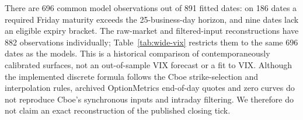There are 696 common model observations out of 891 fitted dates: on 186
dates a required Friday maturity exceeds the 25-business-day horizon, and
nine dates lack an eligible expiry bracket. The raw-market and filtered-input
reconstructions have 882 observations individually; Table~\ref{tab:wide-vix}
restricts them to the same 696 dates as the models. This is a historical
comparison of contemporaneously calibrated surfaces, not an out-of-sample
VIX forecast or a fit to VIX. Although the implemented discrete formula
follows the Cboe strike-selection and interpolation rules, archived
OptionMetrics end-of-day quotes and zero curves do not reproduce Cboe's
synchronous inputs and intraday filtering. We therefore do not claim an
exact reconstruction of the published closing tick.
